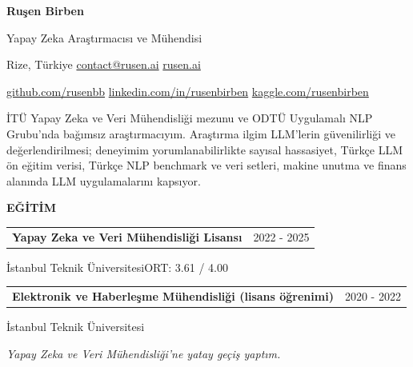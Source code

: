 \documentclass[11pt,a4paper]{article}
\makeatletter
\newcommand{\cvlink}[2]{\href{#1}{\textcolor{linkblue}{#2}}}
\newcommand{\cvsep}{\enspace\textperiodcentered\enspace{}}
\newcommand{\cvsection}[3][5]{%
  \par\Needspace*{#1\baselineskip}\vspace{6pt}%
  {\bfseries\fontsize{11}{13}\selectfont #3}\par\nobreak
  \vspace{3pt}{\color{muted}\hrule height 0.4pt}\nobreak\vspace{6pt}%
}
\newcommand{\cvheading}[2]{%
  \begin{tabularx}{\linewidth}{@{}>{\raggedright\arraybackslash}X@{\hspace{10pt}}r@{}}%
  \textbf{#1} & {\small\color{muted}#2}\\
  \end{tabularx}\par\nobreak
}
\newcommand{\dates}[1]{\hfill{\small\color{muted}#1}}
\newcommand{\cvbody}[1]{{\small\raggedright #1\par}}
\makeatother
\begin{document}
\thispagestyle{firstpage}

{\fontsize{24}{28}\selectfont{}\bfseries{} Ruşen Birben}\par\vspace{3pt}
{\fontsize{11}{13}\selectfont{}Yapay Zeka Araştırmacısı ve Mühendisi}\par\vspace{6pt}
{\small{}
Rize, Türkiye\cvsep
\cvlink{mailto:contact@rusen.ai}{contact@rusen.ai}\cvsep
\cvlink{https://rusen.ai}{rusen.ai}\par\vspace{4pt}
\cvlink{https://github.com/rusenbb}{github.com/rusenbb}\cvsep
\cvlink{https://linkedin.com/in/rusenbirben}{linkedin.com/in/rusenbirben}\cvsep
\cvlink{https://www.kaggle.com/rusenbirben}{kaggle.com/rusenbirben}
}\par\vspace{6pt}
\cvbody{İTÜ Yapay Zeka ve Veri Mühendisliği mezunu ve ODTÜ Uygulamalı NLP Grubu’nda bağımsız araştırmacıyım. Araştırma ilgim LLM’lerin güvenilirliği ve değerlendirilmesi; deneyimim yorumlanabilirlikte sayısal hassasiyet, Türkçe LLM ön eğitim verisi, Türkçe NLP benchmark ve veri setleri, makine unutma ve finans alanında LLM uygulamalarını kapsıyor.}

\cvsection{}{EĞİTİM}
\begin{minipage}{\linewidth}\raggedright
\cvheading{Yapay Zeka ve Veri Mühendisliği Lisansı}{2022 - 2025}
{\small{}İstanbul Teknik Üniversitesi}\dates{ORT: 3.61 / 4.00}\par
\end{minipage}\par\vspace{5pt}
\begin{minipage}{\linewidth}\raggedright
\cvheading{Elektronik ve Haberleşme Mühendisliği (lisans öğrenimi)}{2020 - 2022}
{\small{}İstanbul Teknik Üniversitesi}\par
{\small{}\itshape{}\color{muted}Yapay Zeka ve Veri Mühendisliği'ne yatay geçiş yaptım.}\par\end{minipage}\par\vspace{5pt}
\end{document}
